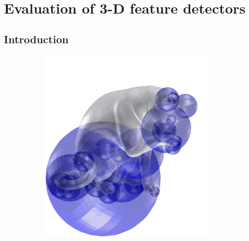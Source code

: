 \chapter{Evaluation of 3-D feature detectors}
\label{chap/eval}

\section{Introduction}

\begin{figure}[t]
	\centering 
	\begin{subfigure}[t]{0.30\linewidth} 
		\centering 
		\includegraphics[width=1\linewidth]{./fig/eval/cat_dog.png} 
		\label{fig/eval/testshapes/dog}
	\end{subfigure}
	\begin{subfigure}[t]{0.30\linewidth} 
		\centering 

\end{subfigure}
\end{figure}
